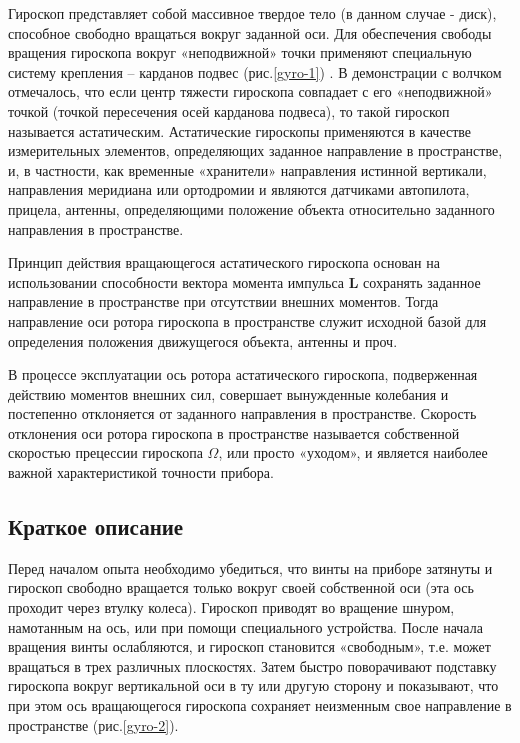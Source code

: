 \documentclass[All.tex]{subfiles}
\begin{document}
		Гироскоп представляет собой массивное твердое тело (в данном случае - диск), способное свободно вращаться вокруг заданной оси. 
		Для обеспечения свободы вращения гироскопа вокруг «неподвижной» точки применяют специальную систему крепления -- карданов подвес (рис.\ref{gyro-1}) .
		В демонстрации с волчком отмечалось, что если центр тяжести гироскопа совпадает с его «неподвижной» точкой (точкой пересечения осей карданова подвеса), то такой гироскоп называется астатическим.
		Астатические гироскопы применяются в качестве измерительных элементов, определяющих заданное направление в пространстве, и, в частности, как временные «хранители» направления истинной вертикали, направления меридиана или ортодромии и являются датчиками автопилота, прицела, антенны, определяющими положение объекта относительно заданного направления в пространстве.
		
		Принцип действия вращающегося астатического гироскопа основан на использовании способности вектора момента импульса \textbf{L} сохранять заданное направление в пространстве при отсутствии внешних моментов.
		Тогда направление оси ротора гироскопа в пространстве служит исходной базой для определения положения движущегося объекта, антенны и проч.
		
		В процессе эксплуатации ось ротора астатического гироскопа, подверженная действию моментов внешних сил, совершает вынужденные колебания и постепенно отклоняется от заданного направления в пространстве.		
		Скорость отклонения оси ротора гироскопа в пространстве называется собственной скоростью прецессии гироскопа $ \Omega $, или просто «уходом», и является наиболее важной характеристикой точности прибора.

	\subsection*{\textcolor{PineGreen}{Краткое описание}}
	
	Перед началом опыта необходимо убедиться, что винты на приборе затянуты и гироскоп свободно вращается только вокруг своей собственной оси (эта ось проходит через втулку колеса).
	Гироскоп приводят во вращение шнуром, намотанным на ось, или при помощи специального устройства.
	После начала вращения винты ослабляются, и гироскоп становится «свободным», т.е. может вращаться в трех различных плоскостях.
	Затем быстро поворачивают подставку гироскопа вокруг вертикальной оси в ту или другую сторону и показывают, что при этом ось вращающегося гироскопа сохраняет неизменным свое направление в пространстве (рис.\ref{gyro-2}).
	
\end{document}
